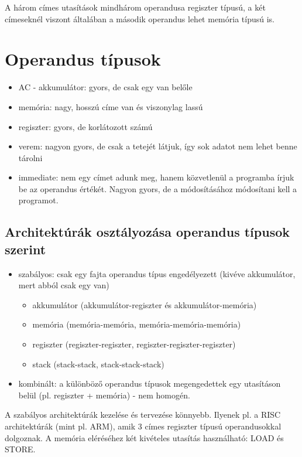 A három címes utasítások mindhárom operandusa regiszter típusú, a két címeseknél viszont általában a második operandus lehet memória típusú is.

\section{Operandus típusok}
\begin{itemize}
    \item AC - akkumulátor: gyors, de csak egy van belőle
    \item memória: nagy, hosszú címe van és viszonylag lassú
    \item regiszter: gyors, de korlátozott számú
    \item verem: nagyon gyors, de csak a tetejét látjuk, így sok adatot nem lehet benne tárolni
    \item immediate: nem egy címet adunk meg, hanem közvetlenül a programba írjuk be az operandus értékét. Nagyon gyors, de a módosításához módosítani kell a programot.
\end{itemize}

\subsection{Architektúrák osztályozása operandus típusok szerint}
\begin{itemize}
    \item szabályos: csak egy fajta operandus típus engedélyezett (kivéve akkumulátor, mert abból csak egy van)
    \begin{itemize}
        \item akkumulátor (akkumulátor-regiszter és akkumulátor-memória)
        \item memória (memória-memória, memória-memória-memória)
        \item regiszter (regiszter-regiszter, regiszter-regiszter-regiszter)
        \item stack (stack-stack, stack-stack-stack)
    \end{itemize}
    \item kombinált: a különböző operandus típusok megengedettek egy utasításon belül (pl. regiszter + memória) - nem homogén.
\end{itemize}

A szabályos architektúrák kezelése és tervezése könnyebb.
Ilyenek pl. a RISC architektúrák (mint pl. ARM), amik 3 címes regiszter típusú operandusokkal dolgoznak.
A memória eléréséhez két kivételes utasítás használható: LOAD és STORE.

